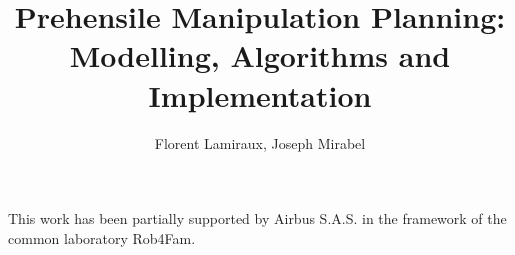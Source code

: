 \documentclass[Afour,sageh,times]{sagej}
\begin{document}

\title{Prehensile Manipulation Planning: Modelling, Algorithms and Implementation}

\author{Florent Lamiraux, Joseph Mirabel}




\begin{abstract}
\end{abstract}


\maketitle



\begin{acks}
This work has been partially supported by Airbus S.A.S. in the framework of the common laboratory Rob4Fam.
\end{acks}

%



\end{document}
